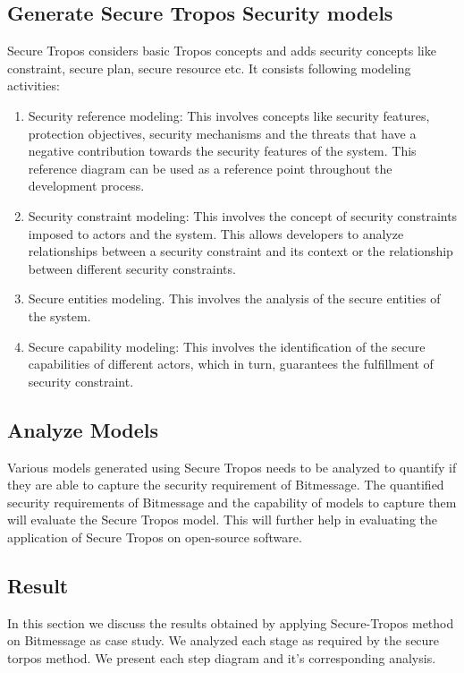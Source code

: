 \documentclass{acm_proc_article-sp}
\begin{document}
\subsection{Generate Secure Tropos Security models}
Secure Tropos considers basic Tropos concepts and adds security concepts like constraint, secure plan, secure resource etc. It consists following modeling activities:
\begin{enumerate}
\item Security reference modeling: This involves concepts like security features, protection objectives, security mechanisms and the threats that have a negative contribution towards the security features of the system. This reference diagram can be used as a reference point throughout the development process.

\item  Security constraint modeling: This involves the concept of security constraints imposed to actors and the system. This allows developers to analyze relationships between a security constraint and its context or the relationship between different security constraints.

\item Secure entities modeling. This involves the analysis of the secure entities of the system.

\item Secure capability modeling: This involves the identification of the secure capabilities of different actors, which in turn, guarantees the fulfillment of security constraint.
\end{enumerate}

\subsection{Analyze Models}
Various models generated using Secure Tropos needs to be analyzed to quantify if they are  able to capture the security requirement of Bitmessage. The quantified security requirements of Bitmessage and the capability of models to capture them will evaluate the Secure Tropos model. This will further help in evaluating the application of Secure Tropos on open-source software.

\subsection{Result}
In this section we discuss the results obtained by applying Secure-Tropos method on Bitmessage as case study. We analyzed each stage as required by the secure torpos method. We present each step diagram and it's corresponding analysis.
\end{document}
